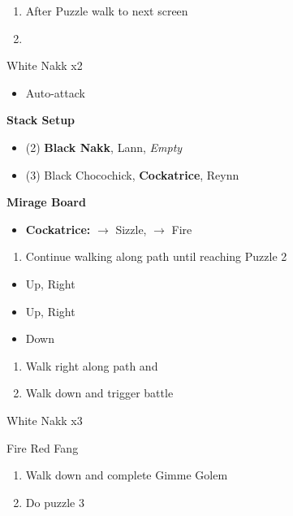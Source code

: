 \begin{enumerate}[resume]
	\item After Puzzle walk to next screen
	\item \cs
\end{enumerate}
\begin{battle}[]{White Nakk x2}
	\begin{itemize}
		\item Auto-attack
	\end{itemize}
\end{battle}
\begin{menu}
\textbf{Stack Setup}
	\begin{itemize}
		\item (2) \textbf{Black Nakk}, Lann, \textit{Empty}
		\item (3) Black Chocochick, \textbf{Cockatrice}, Reynn
	\end{itemize}
\textbf{Mirage Board}
	\begin{itemize}
		\item \textbf{Cockatrice:} $\rightarrow$ Sizzle, $\rightarrow$ Fire
	\end{itemize}
\end{menu}
\begin{enumerate}[resume]
	\item Continue walking along path until reaching Puzzle 2
\end{enumerate}
\begin{puzzle}
	\begin{itemize}
		\item Up, Right
		\item Up, Right
		\item Down
	\end{itemize}
\end{puzzle}
\begin{enumerate}[resume]
	\item Walk right along path and 
	\item Walk down and trigger battle
\end{enumerate}
\begin{battle}[]{White Nakk x3}
	\begin{itemize}
		\reynnf Fire
		\lannf Red Fang
	\end{itemize}
\end{battle}
\begin{enumerate}[resume]
	\item Walk down and complete Gimme Golem
	\item Do puzzle 3
\end{enumerate}
